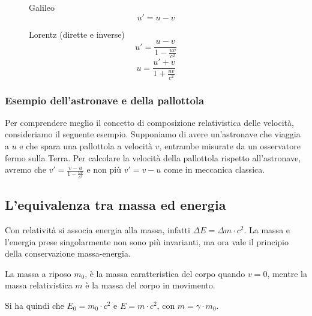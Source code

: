 \begin{figure}[H]
    \begin{minipage}[t]{0.45\textwidth}
        \centering
        Galileo
        \begin{equation*}
            u' = u - v
        \end{equation*}
    \end{minipage}
    \hfill
    \begin{minipage}[t]{0.45\textwidth}
        \centering
        Lorentz (dirette e inverse)
        \begin{equation*}
            u' = \frac{u - v}{1 - \frac{uv}{c^2}}
        \end{equation*}
        \begin{equation*}
            u = \frac{u' + v}{1 + \frac{uv}{c^2}}
        \end{equation*}
    \end{minipage}
\end{figure}

\subsubsection{Esempio dell'astronave e della pallottola}

Per comprendere meglio il concetto di composizione relativistica delle velocità, consideriamo il seguente esempio.
Supponiamo di avere un'astronave che viaggia a $u$ e che spara una pallottola a velocità $v$, entrambe misurate da un osservatore fermo sulla Terra.
Per calcolare la velocità della pallottola rispetto all'astronave, avremo che $v' = \frac{v-u}{1-\frac{uv}{c^2}}$ e non più $v' = v-u$ come in meccanica classica.


\subsection{L'equivalenza tra massa ed energia}

Con relatività si associa energia alla massa, infatti $\Delta E = \Delta m \cdot c^2$.
La massa e l'energia prese singolarmente non sono più invarianti, ma ora vale il principio della conservazione massa-energia.

La massa a riposo $m_0$, è la massa caratteristica del corpo quando $v = 0$, mentre la massa relativistica $m$ è la massa del corpo in movimento.

Si ha quindi che $E_0 = m_0 \cdot c^2$ e $E = m \cdot c^2$, con $m = \gamma \cdot m_0$.

